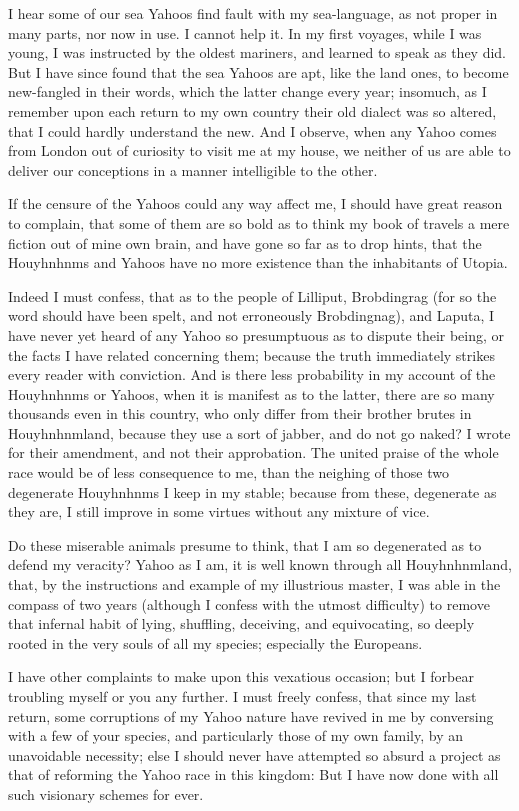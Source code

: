 I hear some of our sea Yahoos find fault with my sea-language, as not proper in many parts, nor now in use.  I cannot help it.  In my first voyages, while I was young, I was instructed by the oldest mariners, and learned to speak as they did.  But I have since found that the sea Yahoos are apt, like the land ones, to become new-fangled in their words, which the latter change every year; insomuch, as I remember upon each return to my own country their old dialect was so altered, that I could hardly understand the new.  And I observe, when any Yahoo comes from London out of curiosity to visit me at my house, we neither of us are able to deliver our conceptions in a manner intelligible to the other.

If the censure of the Yahoos could any way affect me, I should have great reason to complain, that some of them are so bold as to think my book of travels a mere fiction out of mine own brain, and have gone so far as to drop hints, that the Houyhnhnms and Yahoos have no more existence than the inhabitants of Utopia.

Indeed I must confess, that as to the people of Lilliput, Brobdingrag (for so the word should have been spelt, and not erroneously Brobdingnag), and Laputa, I have never yet heard of any Yahoo so presumptuous as to dispute their being, or the facts I have related concerning them; because the truth immediately strikes every reader with conviction.  And is there less probability in my account of the Houyhnhnms or Yahoos, when it is manifest as to the latter, there are so many thousands even in this country, who only differ from their brother brutes in Houyhnhnmland, because they use a sort of jabber, and do not go naked?  I wrote for their amendment, and not their approbation.  The united praise of the whole race would be of less consequence to me, than the neighing of those two degenerate Houyhnhnms I keep in my stable; because from these, degenerate as they are, I still improve in some virtues without any mixture of vice.

Do these miserable animals presume to think, that I am so degenerated as to defend my veracity?  Yahoo as I am, it is well known through all Houyhnhnmland, that, by the instructions and example of my illustrious master, I was able in the compass of two years (although I confess with the utmost difficulty) to remove that infernal habit of lying, shuffling, deceiving, and equivocating, so deeply rooted in the very souls of all my species; especially the Europeans.

I have other complaints to make upon this vexatious occasion; but I forbear troubling myself or you any further.  I must freely confess, that since my last return, some corruptions of my Yahoo nature have revived in me by conversing with a few of your species, and particularly those of my own family, by an unavoidable necessity; else I should never have attempted so absurd a project as that of reforming the Yahoo race in this kingdom: But I have now done with all such visionary schemes for ever.


   
   

